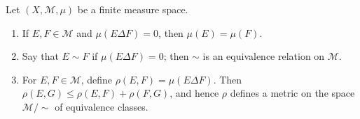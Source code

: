 \newpage

\begin{exercise}
    Let \( (X, \mathcal{M}, \mu) \) be a finite measure space.
    \begin{enumerate}[itemsep=0pt,label={\textbf{\alph*.}}]
        \item If \( E, F \in \mathcal{M} \) and \( \mu(E \Delta F) = 0 \), then \( \mu(E) = \mu(F) \).
        \item Say that \( E \sim F \) if \( \mu(E \Delta F) = 0 \); then \( \sim \) is an equivalence relation on \( \mathcal{M} \).
        \item For \( E, F \in \mathcal{M} \), define \( \rho(E, F) = \mu(E \Delta F) \). Then \( \rho(E, G) \le \rho(E, F) + \rho(F, G) \), and hence \( \rho \) defines a metric on the space \( \mathcal{M}/{\sim} \) of equivalence classes.
    \end{enumerate}
\end{exercise}

